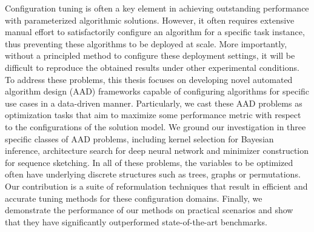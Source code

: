 Configuration tuning is often a key element in achieving outstanding performance with parameterized algorithmic solutions. However, it often requires extensive manual effort to satisfactorily configure an algorithm for a specific task instance, thus preventing these algorithms to be deployed at scale. More importantly, without a principled method to configure these deployment settings, it will be difficult to reproduce the obtained results under other experimental conditions. To address these problems, this thesis focuses on developing novel automated algorithm design (AAD) frameworks capable of configuring algorithms for specific use cases in a data-driven manner. Particularly, we cast these AAD problems as optimization tasks that aim to maximize some performance metric with respect to the configurations of the solution model. We ground our investigation in three specific classes of AAD problems, including kernel selection for Bayesian inference, architecture search for deep neural network and minimizer construction for sequence sketching. In all of these problems, the variables to be optimized often have underlying discrete structures such as trees, graphs or permutations. Our contribution is a suite of reformulation techniques that result in efficient and accurate tuning methods for these configuration domains. Finally, we demonstrate the performance of our methods on practical scenarios and show that they have significantly outperformed state-of-the-art benchmarks.